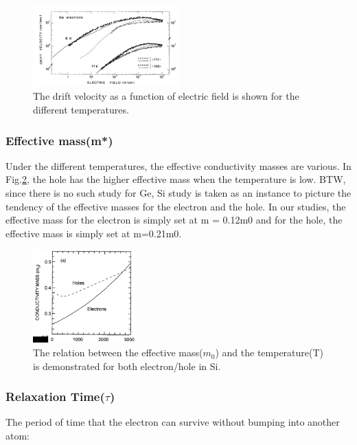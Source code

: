 \documentclass[%
 reprint,
 amsmath,amssymb,
 aps,
]{revtex4-2}
\begin{document}
\begin{figure}[h]
 \centering
 \includegraphics[width=0.5\textwidth]{SHEME/Electron_velocity.png}
 \caption{The drift velocity as a function of electric field is shown for the different temperatures.}
 \label{Electron_velocity}
\end{figure}
\subsubsection{Effective mass(m*)}
Under the different temperatures, the effective conductivity masses are various. In Fig.\ref{effective_Mass_Relation}\cite{6}, the hole has the higher effective mass when the temperature is low. BTW, since there is no such study for Ge, Si study is taken as an instance to picture the tendency of the effective masses for the electron and the hole.  In our studies, the effective mass for the electron is simply set at m = 0.12m0 and for the hole, the effective mass is simply set at m=0.21m0.

\begin{figure}[h]
  \centering
  \includegraphics[width=0.35\textwidth]{SHEME/effective_Mass_Relation.png}
  \caption{The relation between the effective mass($m_{0}$) and the temperature(T) is demonstrated for both electron/hole in Si.}
  \label{effective_Mass_Relation}
\end{figure}

\subsubsection{Relaxation Time($\tau$)}
The period of time that the electron can survive without bumping into another atom:\\ 
	
\end{document}
